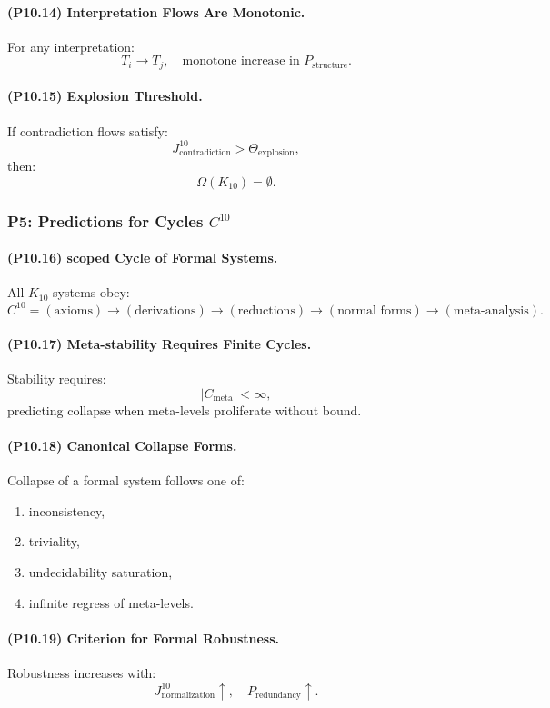 \paragraph{(P10.14) Interpretation Flows Are Monotonic.}
For any interpretation:
\[
T_i \to T_j,
\quad
\text{monotone increase in } P_{\mathrm{structure}}.
\]

\paragraph{(P10.15) Explosion Threshold.}
If contradiction flows satisfy:
\[
J_{\mathrm{contradiction}}^{10} > \Theta_{\mathrm{explosion}},
\]
then:
\[
\Omega(K_{10}) = \emptyset.
\]

\subsubsection{P5: Predictions for Cycles $C^{10}$}

\paragraph{(P10.16) scoped Cycle of Formal Systems.}
All $K_{10}$ systems obey:
\[
C^{10} =
(\text{axioms}) \to (\text{derivations}) \to
(\text{reductions}) \to (\text{normal forms}) \to
(\text{meta-analysis}).
\]

\paragraph{(P10.17) Meta-stability Requires Finite Cycles.}
Stability requires:
\[
|C_{\mathrm{meta}}| < \infty,
\]
predicting collapse when meta-levels proliferate without bound.

\paragraph{(P10.18) Canonical Collapse Forms.}
Collapse of a formal system follows one of:
\begin{enumerate}
    \item inconsistency,
    \item triviality,
    \item undecidability saturation,
    \item infinite regress of meta-levels.
\end{enumerate}

\paragraph{(P10.19) Criterion for Formal Robustness.}
Robustness increases with:
\[
J_{\mathrm{normalization}}^{10} \uparrow,
\quad
P_{\mathrm{redundancy}} \uparrow.
\]

